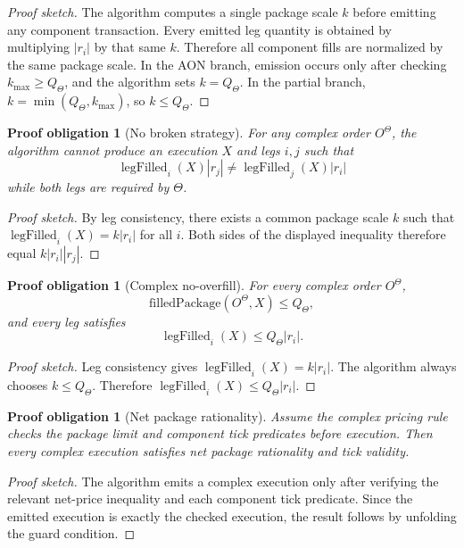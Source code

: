 \documentclass[11pt]{article}
\newtheorem{proofobligation}[definition]{Proof obligation}
\newcommand{\legfilled}{\operatorname{legFilled}}
\begin{document}
\begin{proof}[Proof sketch]
The algorithm computes a single package scale \(k\) before emitting any component transaction. Every emitted leg quantity is obtained by multiplying \(|r_i|\) by that same \(k\). Therefore all component fills are normalized by the same package scale. In the AON branch, emission occurs only after checking \(k_{\max}\ge Q_\Theta\), and the algorithm sets \(k=Q_\Theta\). In the partial branch, \(k=\min(Q_\Theta,k_{\max})\), so \(k\le Q_\Theta\).
\end{proof}

\begin{proofobligation}[No broken strategy]
For any complex order \(O^\Theta\), the algorithm cannot produce an execution \(X\) and legs \(i,j\) such that
\[
\legfilled_i(X)|r_j|
\ne
\legfilled_j(X)|r_i|
\]
while both legs are required by \(\Theta\).
\end{proofobligation}

\begin{proof}[Proof sketch]
By leg consistency, there exists a common package scale \(k\) such that \(\legfilled_i(X)=k|r_i|\) for all \(i\). Both sides of the displayed inequality therefore equal \(k|r_i||r_j|\).
\end{proof}

\begin{proofobligation}[Complex no-overfill]
For every complex order \(O^\Theta\),
\[
\mathrm{filledPackage}(O^\Theta,X)\le Q_\Theta,
\]
and every leg satisfies
\[
\legfilled_i(X)\le Q_\Theta |r_i|.
\]
\end{proofobligation}

\begin{proof}[Proof sketch]
Leg consistency gives \(\legfilled_i(X)=k|r_i|\). The algorithm always chooses \(k\le Q_\Theta\). Therefore \(\legfilled_i(X)\le Q_\Theta|r_i|\).
\end{proof}

\begin{proofobligation}[Net package rationality]
Assume the complex pricing rule checks the package limit and component tick predicates before execution. Then every complex execution satisfies net package rationality and tick validity.
\end{proofobligation}

\begin{proof}[Proof sketch]
The algorithm emits a complex execution only after verifying the relevant net-price inequality and each component tick predicate. Since the emitted execution is exactly the checked execution, the result follows by unfolding the guard condition.
\end{proof}
\end{document}
